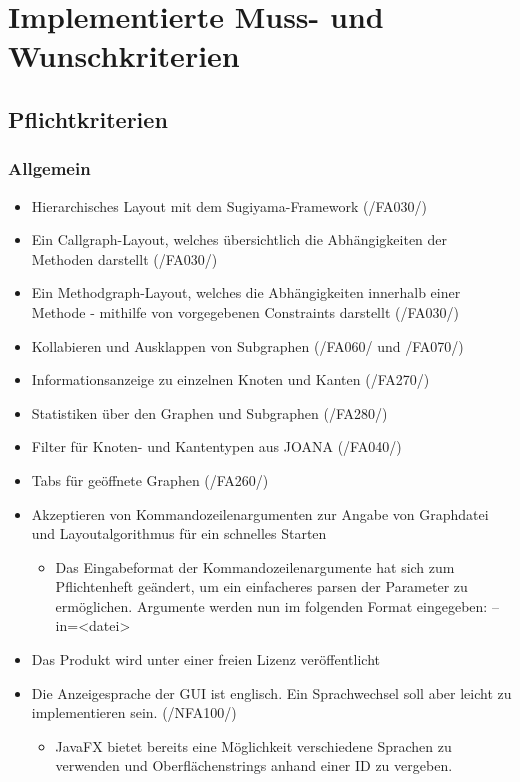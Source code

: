 \chapter{Implementierte Muss- und Wunschkriterien}
\label{ch:implkrit}

\section{Pflichtkriterien}

\subsection{Allgemein}
\begin{itemize}
	\item Hierarchisches Layout mit dem Sugiyama-Framework (/FA030/)
	\item Ein Callgraph-Layout, welches übersichtlich die Abhängigkeiten der Methoden darstellt (/FA030/)
	\item Ein Methodgraph-Layout, welches die Abhängigkeiten innerhalb einer Methode - mithilfe von vorgegebenen Constraints darstellt (/FA030/)
	\item Kollabieren und Ausklappen von Subgraphen (/FA060/ und /FA070/)
	\item Informationsanzeige zu einzelnen Knoten und Kanten (/FA270/)
	\item Statistiken über den Graphen und Subgraphen (/FA280/)
	\item Filter für Knoten- und Kantentypen aus JOANA (/FA040/)
	\item Tabs für geöffnete Graphen (/FA260/)
	\item Akzeptieren von Kommandozeilenargumenten zur Angabe von Graphdatei und Layoutalgorithmus für ein schnelles Starten
	\begin{itemize}
		\item Das Eingabeformat der Kommandozeilenargumente hat sich zum Pflichtenheft geändert, um ein einfacheres parsen der Parameter zu  ermöglichen. Argumente werden nun im folgenden Format eingegeben: \glqq--in=<datei>\grqq
	\end{itemize}
	\item Das Produkt wird unter einer freien Lizenz veröffentlicht
	\item Die Anzeigesprache der GUI ist englisch. Ein Sprachwechsel soll aber leicht zu implementieren sein. (/NFA100/)
	\begin{itemize}
		\item JavaFX bietet bereits eine Möglichkeit verschiedene Sprachen zu verwenden und Oberflächenstrings anhand einer ID zu vergeben.
	\end{itemize}
\end{itemize}

